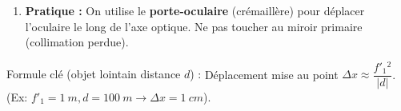\documentclass[11pt]{article}
\newcommand{\cle}[1]{{\popxbold\color{popdark}#1}}
\begin{document}
\begin{methode}
\begin{enumerate}
\begin{itemize}
        \item Calculer la distance objet $p_2$ (oculaire-image intermédiaire) via $\frac{1}{f'_2} = \frac{1}{p'_2} - \frac{1}{p_2}$.
        \item Comparer $|p_2|$ à $f'_2$ (position réglage normal).
        \item Myope ($p'_2 = P_L < 0$, $|P_L| < \infty$) : $|p_2| < f'_2$. Il faut \textbf{rapprocher l'oculaire de l'image intermédiaire} (avancer l'oculaire vers le miroir).
        \item Hypermétrope ($p'_2 = -P_P$, $|P_P| > \SI{25}{cm}$) : $|p_2| < f'_2$ aussi (mais moins). Il faut \textbf{avancer l'oculaire}.
        \item \emph{Note :} Pour un emmétrope réglé au point proche ($\SI{25}{cm}$), on avance aussi l'oculaire.
    \end{itemize}
    \item \textbf{Pratique :} On utilise le \textbf{porte-oculaire} (crémaillère) pour déplacer l'oculaire le long de l'axe optique. Ne pas toucher au miroir primaire (collimation perdue).
\end{enumerate}
\cle{Formule clé (objet lointain distance $d$) :} Déplacement mise au point $\Delta x \approx \dfrac{f'_1{}^2}{|d|}$. (Ex: $f'_1=\SI{1}{m}, d=\SI{100}{m} \rightarrow \Delta x = \SI{1}{cm}$).
\end{methode}
\end{document}
